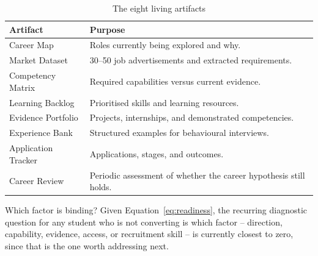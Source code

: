 \documentclass{reportkit}
\begin{document}
\begin{table}[H]
\caption{The eight living artifacts}
\label{tab:artifacts}
\centering
\begin{tabular}{lp{7.6cm}}
\toprule
Artifact & Purpose \\
\midrule
Career Map & Roles currently being explored and why. \\
Market Dataset & 30--50 job advertisements and extracted requirements. \\
Competency Matrix & Required capabilities versus current evidence. \\
Learning Backlog & Prioritised skills and learning resources. \\
Evidence Portfolio & Projects, internships, and demonstrated competencies. \\
Experience Bank & Structured examples for behavioural interviews. \\
Application Tracker & Applications, stages, and outcomes. \\
Career Review & Periodic assessment of whether the career hypothesis still holds. \\
\bottomrule
\end{tabular}
\end{table}

\begin{researchproblem}{Which factor is binding?}
Given Equation~\ref{eq:readiness}, the recurring diagnostic question for any student
who is not converting is which factor -- direction, capability, evidence, access, or
recruitment skill -- is currently closest to zero, since that is the one worth
addressing next.
\end{researchproblem}
\end{document}
